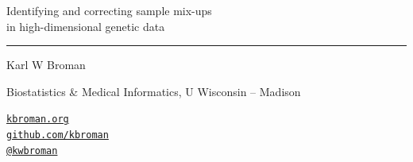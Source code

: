 \documentclass[12pt]{article}
\newcommand{\titlesize}{\fontsize{40}{50} \selectfont}
\newcommand{\headsize}{\fontsize{35}{35} \selectfont}
\newcommand{\textsize}{\fontsize{30}{35} \selectfont}
\newcommand{\smallersize}{\fontsize{20}{25} \selectfont}
\begin{document}
\thispagestyle{empty}

\begin{center}
\titlesize \color{myyellow}

\vspace*{10mm}

{\headsize Identifying and correcting sample mix-ups \\
in high-dimensional genetic data}

\color{mypink}
\rule{10in}{1mm}

\vspace{10mm}

\textsize \color{myblue}
Karl W Broman
\vspace{5mm}

{\smallersize Biostatistics \& Medical Informatics,
U Wisconsin -- Madison
\vspace{20mm}


\href{http://kbroman.org}{\tt kbroman.org} \\
\href{https://github.com/kbroman}{\tt github.com/kbroman} \\
\href{https://twitter.com/kwbroman}{\tt @kwbroman}

}

\end{center}


\newpage
\thispagestyle{empty}

\vspace*{-0.85in}
\end{document}

